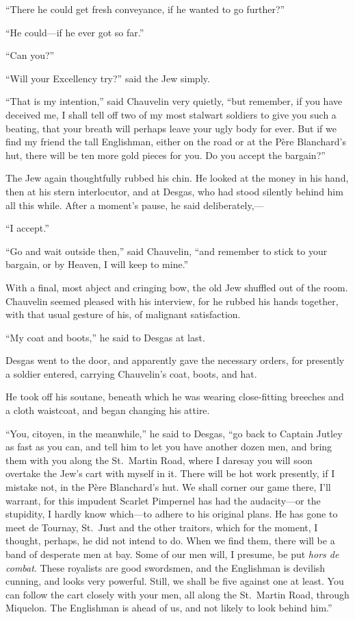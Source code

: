 \documentclass[paper=a5,BCOR=7mm,twoside,DIV=calc,12pt,usegeometry,chapterprefix,endperiod,headings=big]{scrbook}
\begin{document}
\enquote{There he could get fresh conveyance, if he wanted to go further?}

\enquote{He could---if he ever got so far.}

\enquote{Can you?}

\enquote{Will your Excellency try?} said the Jew simply.

\enquote{That is my intention,} said Chauvelin very quietly, \enquote{but remember, if you have deceived me, I shall tell off two of my most stalwart soldiers to give you such a beating, that your breath will perhaps leave your ugly body for ever. But if we find my friend the tall Englishman, either on the road or at the Père Blanchard's hut, there will be ten more gold pieces for you. Do you accept the bargain?}

The Jew again thoughtfully rubbed his chin. He looked at the money in his hand, then at his stern interlocutor, and at Desgas, who had stood silently behind him all this while. After a moment's pause, he said deliberately,---

\enquote{I accept.}

\enquote{Go and wait outside then,} said Chauvelin, \enquote{and remember to stick to your bargain, or by Heaven, I will keep to mine.}

With a final, most abject and cringing bow, the old Jew shuffled out of the room. Chauvelin seemed pleased with his interview, for he rubbed his hands together, with that usual gesture of his, of malignant satisfaction.

\enquote{My coat and boots,} he said to Desgas at last.

Desgas went to the door, and apparently gave the necessary orders, for presently a soldier entered, carrying Chauvelin's coat, boots, and hat.

He took off his soutane, beneath which he was wearing close-fitting breeches and a cloth waistcoat, and began changing his attire.

\enquote{You, citoyen, in the meanwhile,} he said to Desgas, \enquote{go back to Captain Jutley as fast as you can, and tell him to let you have another dozen men, and bring them with you along the St.~Martin Road, where I daresay you will soon overtake the Jew's cart with myself in it. There will be hot work presently, if I mistake not, in the Père Blanchard's hut. We shall corner our game there, I'll warrant, for this impudent Scarlet Pimpernel has had the audacity---or the stupidity, I hardly know which---to adhere to his original plans. He has gone to meet de Tournay, St.~Just and the other traitors, which for the moment, I thought, perhaps, he did not intend to do. When we find them, there will be a band of desperate men at bay. Some of our men will, I presume, be put \textit{hors de combat}. These royalists are good swordsmen, and the Englishman is devilish cunning, and looks very powerful. Still, we shall be five against one at least. You can follow the cart closely with your men, all along the St.~Martin Road, through Miquelon. The Englishman is ahead of us, and not likely to look behind him.}
\end{document}
